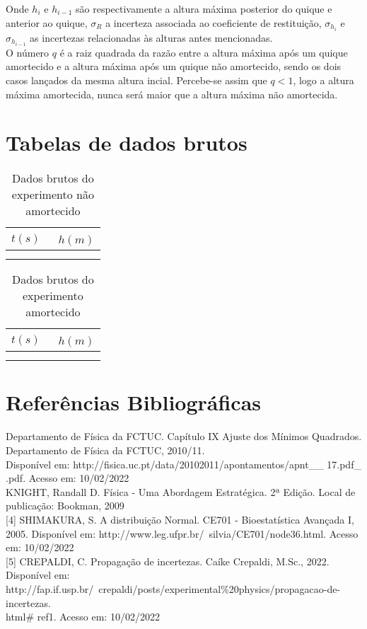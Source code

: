 \documentclass[a4paper, 12pt]{article}
\begin{document}
		\noindent Onde $h_i$ e $h_{i-1}$ são respectivamente a altura máxima posterior do quique e anterior ao quique, $\sigma_R$ a incerteza associada ao coeficiente de restituição, $\sigma_{h_i}$ e $\sigma_{h_{i-1}}$ as incertezas relacionadas às alturas antes mencionadas. \\
		O número $q$ é a raiz quadrada da razão entre a altura máxima após um quique amortecido e a altura máxima após um quique não amortecido, sendo os dois casos lançados da mesma altura incial. Percebe-se assim que  $q<1$, logo a altura máxima amortecida, nunca será maior que a altura máxima não amortecida.
		\newpage
		\section{Tabelas de dados brutos}
		
		\begingroup
		\centering			
			\begin{longtable}{c|c}
			\hline
				$t(s)$ & \ $h(m)$ \\	  			
  			\hline
  				 \\
  			\hline				
				\caption{Dados brutos do experimento não amortecido}		
			\end{longtable}
			\label{tcm}
		\endgroup
			\newpage
		
		\begingroup
		\centering			
			\begin{longtable}{c|c}
			\hline
				$t(s)$ & \ $h(m)$ \\	  			
  			\hline
  				 \\
  			\hline				
				\caption{Dados brutos do experimento amortecido}		
			\end{longtable}
			\label{tcm}
		\endgroup
		
		\newpage		
		\section{Referências Bibliográficas}
		\noindent [1] Departamento de Física da FCTUC. Capítulo IX Ajuste dos Mínimos Quadrados. Departamento de Física da FCTUC, 2010/11. \\ 
		Disponível em: http://fisica.uc.pt/data/20102011/apontamentos/apnt\_\!\_\! 17.pdf\_\! .pdf. Acesso em: 10/02/2022 \vspace{5pt} \\
		\noindent [3] KNIGHT, Randall D. Física - Uma Abordagem Estratégica. 2ª Edição. Local de publicação: Bookman, 2009 \vspace{5pt} \\[0pt]
		[4] SHIMAKURA, S. A distribuição Normal. CE701 - Bioestatística Avançada I, 2005. Disponível em: http://www.leg.ufpr.br/~silvia/CE701/node36.html. Acesso em: 10/02/2022 \vspace{5pt} \\[0pt]
		[5] CREPALDI, C. Propagação de incertezas. Caíke Crepaldi, M.Sc., 2022. \\ Disponível em: http://fap.if.usp.br/~crepaldi/posts/experimental\%20physics/propagacao-de-incertezas.\\html\#\! ref1. Acesso em: 10/02/2022 \\
		
		

		
\end{document}
